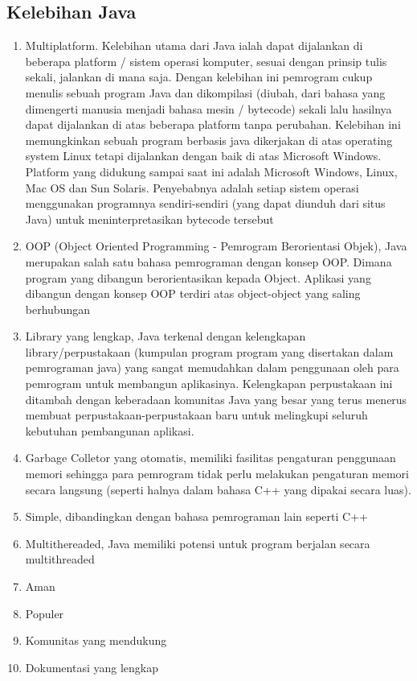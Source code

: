 \subsection{Kelebihan Java}
\begin{enumerate}
	\item Multiplatform. Kelebihan utama dari Java ialah dapat dijalankan di beberapa platform / sistem operasi komputer, sesuai dengan prinsip tulis sekali, jalankan di mana saja. Dengan kelebihan ini pemrogram cukup menulis sebuah program Java dan dikompilasi (diubah, dari bahasa yang dimengerti manusia menjadi bahasa mesin / bytecode) sekali lalu hasilnya dapat dijalankan di atas beberapa platform tanpa perubahan. Kelebihan ini memungkinkan sebuah program berbasis java dikerjakan di atas operating system Linux tetapi dijalankan dengan baik di atas Microsoft Windows. Platform yang didukung sampai saat ini adalah Microsoft Windows, Linux, Mac OS dan Sun Solaris. Penyebabnya adalah setiap sistem operasi menggunakan programnya sendiri-sendiri (yang dapat diunduh dari situs Java) untuk meninterpretasikan bytecode tersebut
	\item OOP (Object Oriented Programming - Pemrogram Berorientasi Objek), Java merupakan salah satu bahasa pemrograman dengan konsep OOP. Dimana program yang dibangun berorientasikan kepada Object. Aplikasi yang dibangun dengan konsep OOP terdiri atas object-object yang saling berhubungan
	\item Library yang lengkap, Java terkenal dengan kelengkapan library/perpustakaan (kumpulan program program yang disertakan dalam pemrograman java) yang sangat memudahkan dalam penggunaan oleh para pemrogram untuk membangun aplikasinya. Kelengkapan perpustakaan ini ditambah dengan keberadaan komunitas Java yang besar yang terus menerus membuat perpustakaan-perpustakaan baru untuk melingkupi seluruh kebutuhan pembangunan aplikasi.
	\item Garbage Colletor yang otomatis, memiliki fasilitas pengaturan penggunaan memori sehingga para pemrogram tidak perlu melakukan pengaturan memori secara langsung (seperti halnya dalam bahasa C++ yang dipakai secara luas).
	\item Simple, dibandingkan dengan bahasa pemrograman lain seperti C++
	\item Multithereaded, Java memiliki potensi untuk program berjalan secara multithreaded
	\item Aman
	\item Populer
	\item Komunitas yang mendukung
	\item Dokumentasi yang lengkap
\end{enumerate}

